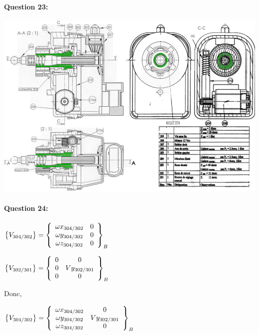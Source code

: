 \newpage

\paragraph{Question 23:}

\begin{center}
  \includegraphics[width=\linewidth]{img/rep13_cor}
\end{center}

\paragraph{Question 24:}

$\left\{V_{304/302}\right\}=\left\{
\begin{array}{c c}
\omega x_{304/302} & 0 \\
\omega y_{304/302} & 0 \\
\omega z_{304/302} & 0 \\
\end{array}
\right\}_B$

$\left\{V_{302/301}\right\}=\left\{
\begin{array}{c c}
0 & 0 \\
0 & Vy_{302/301} \\
0 & 0 \\
\end{array}
\right\}_B$

Donc,

$\left\{V_{304/302}\right\}=\left\{
\begin{array}{c c}
\omega x_{304/302} & 0 \\
\omega y_{304/302} & Vy_{302/301} \\
\omega z_{304/302} & 0 \\
\end{array}
\right\}_B$

